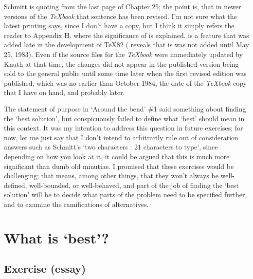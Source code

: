 Schmitt is quoting from the last page of Chapter 25;  the point is,
that in newer versions of the \emph{TeXbook}  that sentence has been revised.
I'm not sure what the latest printing says, since I don't have a copy,
but I think it simply refers the reader to Appendix H, where the
significance of \cmd{\hyphenchar} is explained. \cmd{\hyphenchar} is a feature that
was added late in the development of TeX82 ( reveals that is
was not added until May 25, 1983). Even if the source files for the
\emph{TeXbook} were immediately updated by Knuth at that time, the changes did
not appear in the published version being sold to the general public
until some time later  when the first revised edition was published,
which was no earlier than October 1984, the date of the \emph{TeXbook} copy
that I have on hand, and probably later.

The statement of purpose in `Around the bend' \#1 said something
about finding the `best solution', but conspicuously failed to define
what `best' should mean in this context. It was my intention to address
this question in future exercises; for now, let me just say that I
don't intend to arbitrarily rule out of consideration answers such as
Schmitt's `two characters : 21 characters to type', since depending on
how you look at it, it could be argued that this is much more
significant than dumb old \cmd{\hyphenchar} minutiae. I promised that these
exercises would be challenging; that means, among other things, that
they won't always be well-defined, well-bounded, or well-behaved, and
part of the job of finding the `best solution' will be to decide what
parts of the problem need to be specified further, and to examine the
ramifications of alternatives.



\chapter{What is `best'?}

\section{Exercise (essay)}


\begin{comment}
[Exercises 4,5,6,7 were originally posted together on 4 Nov 91]
Date: Mon 4 Nov 91 16:42:44-EST
From: Michael Downes <MJD@MATH.AMS.COM>
Subject: Around the bend #2
To: info-tex@shsu.edu
\end{comment}

